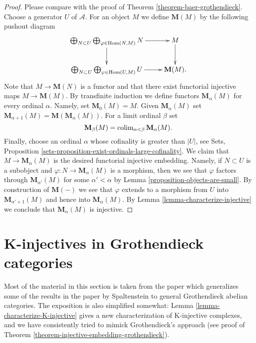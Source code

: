 \begin{proof}
Please compare with the proof of
Theorem \ref{theorem-baer-grothendieck}.
Choose a generator $U$ of $\mathcal{A}$. For an object $M$ we define
$\mathbf{M}(M)$ by the following pushout diagram
$$
\xymatrix{
\bigoplus_{N \subset U}
\bigoplus_{\varphi \in \Hom(N, M)}
N \ar[r] \ar[d] & M \ar[d] \\
\bigoplus_{N \subset U}
\bigoplus_{\varphi \in \Hom(U, M)}
U \ar[r] &  \mathbf{M}(M).
}
$$
Note that $M \to \mathbf{M}(N)$ is a functor and that there
exist functorial injective maps $M \to \mathbf{M}(M)$. By transfinite
induction we define functors $\mathbf{M}_\alpha(M)$ for every
ordinal $\alpha$. Namely, set $\mathbf{M}_0(M) = M$. Given
$\mathbf{M}_\alpha(M)$ set
$\mathbf{M}_{\alpha + 1}(M) = \mathbf{M}(\mathbf{M}_\alpha(M))$.
For a limit ordinal $\beta$ set
$$
\mathbf{M}_\beta(M) = \mathop{\rm colim}\nolimits_{\alpha < \beta} \mathbf{M}_\alpha(M).
$$
Finally, choose an ordinal $\alpha$ whose cofinality is greater than $|U|$, see
Sets, Proposition \ref{sets-proposition-exist-ordinals-large-cofinality}.
We claim that $M \to \mathbf{M}_\alpha(M)$ is the desired functorial
injective embedding. Namely, if $N \subset U$ is a subobject and
$\varphi : N \to \mathbf{M}_\alpha(M)$ is a morphism, then we see that
$\varphi$ factors through $\mathbf{M}_{\alpha'}(M)$ for some
$\alpha' < \alpha$ by
Lemma \ref{proposition-objects-are-small}.
By construction of $\mathbf{M}(-)$ we see that $\varphi$ extends to
a morphism from $U$ into $\mathbf{M}_{\alpha' + 1}(M)$ and hence into
$\mathbf{M}_\alpha(M)$. By
Lemma \ref{lemma-characterize-injective}
we conclude that $\mathbf{M}_\alpha(M)$ is injective.
\end{proof}













\section{K-injectives in Grothendieck categories}
\label{section-K-injective}

\noindent
Most of the material in this section is taken from the paper
\cite{serpe} which generalizes some of the results in the paper
\cite{Spaltenstein}
by Spaltenstein to general Grothendieck abelian categories.
The exposition is also simplified somewhat:
Lemma \ref{lemma-characterize-K-injective}
gives a new characterization of K-injective complexes,
and we have consistently tried to mimick Grothendieck's approach
(see proof of
Theorem \ref{theorem-injective-embedding-grothendieck}).


